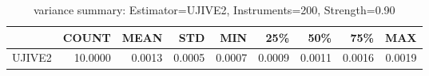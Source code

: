 \begin{table}[ht]
\centering
\caption{variance summary: Estimator=UJIVE2, Instruments=200, Strength=0.90}
\begin{tabular}{lrrrrrrrr}
\toprule
 & COUNT & MEAN & STD & MIN & 25\% & 50\% & 75\% & MAX \\
\midrule
UJIVE2 & 10.0000 & 0.0013 & 0.0005 & 0.0007 & 0.0009 & 0.0011 & 0.0016 & 0.0019 \\
\bottomrule
\end{tabular}
\end{table}
